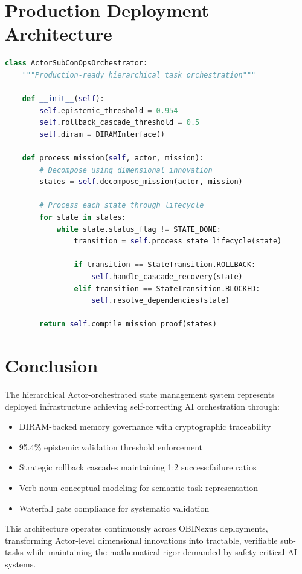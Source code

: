 \documentclass[11pt,conference]{IEEEtran}
\theoremstyle{definition}
\begin{document}
\section{Production Deployment Architecture}

\begin{lstlisting}[language=Python,caption={Complete orchestrator implementation}]
class ActorSubConOpsOrchestrator:
    """Production-ready hierarchical task orchestration"""
    
    def __init__(self):
        self.epistemic_threshold = 0.954
        self.rollback_cascade_threshold = 0.5
        self.diram = DIRAMInterface()
        
    def process_mission(self, actor, mission):
        # Decompose using dimensional innovation
        states = self.decompose_mission(actor, mission)
        
        # Process each state through lifecycle
        for state in states:
            while state.status_flag != STATE_DONE:
                transition = self.process_state_lifecycle(state)
                
                if transition == StateTransition.ROLLBACK:
                    self.handle_cascade_recovery(state)
                elif transition == StateTransition.BLOCKED:
                    self.resolve_dependencies(state)
                    
        return self.compile_mission_proof(states)
\end{lstlisting}

\section{Conclusion}

The hierarchical Actor-orchestrated state management system represents deployed infrastructure achieving self-correcting AI orchestration through:
\begin{itemize}
    \item DIRAM-backed memory governance with cryptographic traceability
    \item 95.4\% epistemic validation threshold enforcement
    \item Strategic rollback cascades maintaining 1:2 success:failure ratios
    \item Verb-noun conceptual modeling for semantic task representation
    \item Waterfall gate compliance for systematic validation
\end{itemize}

This architecture operates continuously across OBINexus deployments, transforming Actor-level dimensional innovations into tractable, verifiable sub-tasks while maintaining the mathematical rigor demanded by safety-critical AI systems.

\printglossary[title={Verb-Noun Concept Glossary},toctitle={Glossary}]
\end{document}
